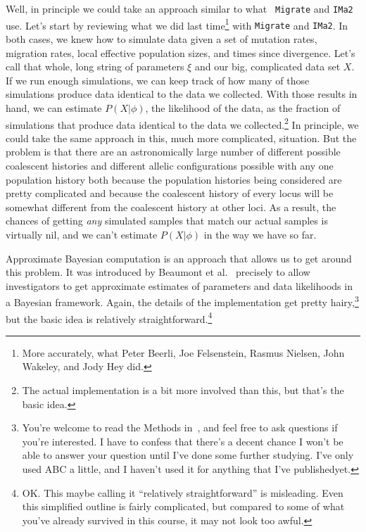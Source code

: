 Well, in principle we could take an approach similar to what {\tt
  Migrate} and {\tt IMa2} use. Let's start by reviewing what we did
last time\footnote{More accurately, what Peter Beerli, Joe
  Felsenstein, Rasmus Nielsen, John Wakeley, and Jody Hey did.} with
{\tt Migrate} and {\tt IMa2}. In both cases, we knew how to simulate
data given a set of mutation rates, migration rates, local effective
population sizes, and times since divergence. Let's call that whole,
long string of parameters $\xi$ and our big, complicated data set
$X$. If we run enough simulations, we can keep track of how many of
those simulations produce data identical to the data we
collected. With those results in hand, we can estimate $P(X|\phi)$,
the likelihood of the data, as the fraction of simulations that
produce data identical to the data we collected.\footnote{The actual
  implementation is a bit more involved than this, but that's the
  basic idea.} In principle, we could take the same approach in this,
much more complicated, situation. But the problem is that there are an
astronomically large number of different possible coalescent histories
and different allelic configurations possible with any one population
history both because the population histories being considered are
pretty complicated and because the coalescent history of every locus
will be somewhat different from the coalescent history at other
loci. As a result, the chances of getting {\it any\/} simulated
samples that match our actual samples is virtually nil, and we can't
estimate $P(X|\phi)$ in the way we have so far.

Approximate Bayesian computation is an approach that allows us to get
around this problem. It was introduced by Beaumont et
al.~\cite{Beaumont-etal-2002} precisely to allow investigators to get
approximate estimates of parameters and data likelihoods in a Bayesian
framework. Again, the details of the implementation get pretty
hairy,\footnote{You're welcome to read the Methods
  in~\cite{Beaumont-etal-2002}, and feel free to ask questions if
  you're interested. I have to confess that there's a decent chance I
  won't be able to answer your question until I've done some further
  studying. I've only used ABC a little, and I haven't used it for
  anything that I've published{\dash}yet.} but the basic idea is relatively
straightforward.\footnote{OK. This maybe calling it ``relatively
  straightforward'' is misleading. Even this simplified outline is
  fairly complicated, but compared to some of what you've already
  survived in this course, it may not look too awful.}

